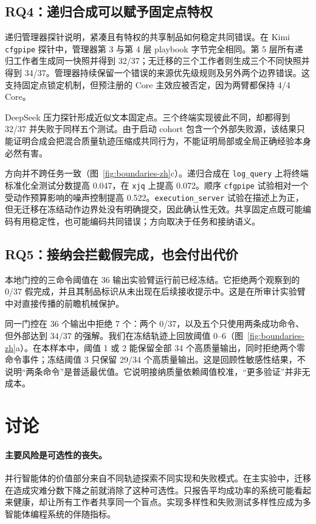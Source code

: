 \documentclass[UTF8,letterpaper,10pt,twocolumn]{ctexart}
\begin{document}
\subsection{RQ4：递归合成可以赋予固定点特权}

递归管理器探针说明，紧凑且有特权的共享制品如何稳定共同错误。在 Kimi \texttt{cfgpipe} 探针中，管理器第 3 与第 4 层 playbook 字节完全相同。第 5 层所有递归工作者生成同一快照并得到 32/37；无迁移的三个工作者则生成三个不同快照并得到 34/37。管理器持续保留一个错误的来源优先级规则及另外两个边界错误。这支持固定点锁定机制，但预注册的 Core 主效应被否定，因为两臂都保持 4/4 Core。

DeepSeek 压力探针形成近似文本固定点。三个终端实现彼此不同，却都得到 32/37 并失败于同样五个测试。由于启动 cohort 包含一个外部失败源，该结果只能证明合成会把混合质量轨迹压缩成共同行为，不能证明局部或全局正确经验本身必然有害。

方向并不跨任务一致（图~\ref{fig:boundaries-zh}c）。递归合成在 \texttt{log\_query} 上将终端标准化全测试分数提高 0.047，在 \texttt{xjq} 上提高 0.072。顺序 \texttt{cfgpipe} 试验相对一个受动作预算影响的噪声控制提高 0.522。\texttt{execution\_server} 试验在描述上为正，但无迁移在冻结动作边界处没有明确提交，因此确认性无效。共享固定点既可能编码有用稳定性，也可能编码共同错误；方向取决于任务和接纳语义。

\subsection{RQ5：接纳会拦截假完成，也会付出代价}

本地门控的三命令阈值在 36 输出实验臂运行前已经冻结。它拒绝两个观察到的 0/37 假完成，并且其制品标识从未出现在后续接收提示中。这是在所审计实验臂中对直接传播的前瞻机械保护。

同一门控在 36 个输出中拒绝 7 个：两个 0/37，以及五个只使用两条成功命令、但外部达到 34/37 的强解。我们在冻结轨迹上回放阈值 0--6（图~\ref{fig:boundaries-zh}a）。在本样本中，阈值 1 或 2 能保留全部 34 个高质量输出，同时拒绝两个零命令事件；冻结阈值 3 只保留 29/34 个高质量输出。这是回顾性敏感性结果，不说明“两条命令”是普适最优值。它说明接纳质量依赖阈值校准，“更多验证”并非无成本。

\section{讨论}

\paragraph{主要风险是可选性的丧失。}
并行智能体的价值部分来自不同轨迹探索不同实现和失败模式。在主实验中，迁移在造成灾难分数下降之前就消除了这种可选性。只报告平均成功率的系统可能看起来健康，却让所有工作者共享同一个盲点。实现多样性和失败测试多样性应成为多智能体编程系统的伴随指标。
\end{document}
